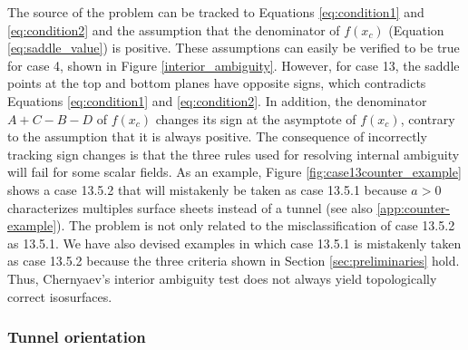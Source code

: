The source of the problem can be tracked to Equations \ref{eq:condition1} and \ref{eq:condition2} and the assumption that the denominator of $f(x_c)$ (Equation \eqref{eq:saddle_value}) is positive. 
These assumptions can easily be verified to be true for case 4, shown in Figure \ref{interior_ambiguity}. However, for case 13, the saddle points at the top and bottom planes have opposite signs, which contradicts Equations \eqref{eq:condition1} and \eqref{eq:condition2}. In addition, the denominator $A+C-B-D$ of $f(x_c)$ changes its sign at the asymptote of $f(x_c)$, contrary to the assumption that it is always positive.
%
The consequence of incorrectly tracking sign changes is that the three rules used for resolving internal ambiguity will fail for some scalar fields. As an example, Figure \ref{fig:case13counter_example} shows a case 13.5.2 that will mistakenly be taken as case 13.5.1 because  $a > 0$ characterizes multiples surface sheets instead of a tunnel (see also \ref{app:counter-example}).
%
The problem is not only related to the misclassification of case 13.5.2 as 13.5.1. We have also devised examples in which case 13.5.1 is mistakenly taken as case 13.5.2 because the three criteria shown in Section \ref{sec:preliminaries} hold. Thus, Chernyaev's interior ambiguity test does not always yield topologically correct isosurfaces.

\subsubsection{Tunnel orientation}

